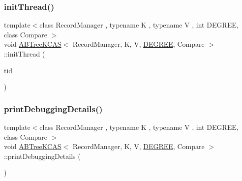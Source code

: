 \mbox{\label{classABTreeKCAS_a4cf7b4d16d93940cc660a636a86e2601}} 
\subsubsection{\texorpdfstring{init\+Thread()}{initThread()}}
{\footnotesize\ttfamily template$<$class Record\+Manager , typename K , typename V , int D\+E\+G\+R\+EE, class Compare $>$ \\
void \hyperlink{classABTreeKCAS}{A\+B\+Tree\+K\+C\+AS}$<$ Record\+Manager, K, V, \hyperlink{brown__sigouin__abtree__kcas_2adapter_8h_a5d88b17d70c985f2f2b8e987037fd6dd}{D\+E\+G\+R\+EE}, Compare $>$\+::init\+Thread (\begin{DoxyParamCaption}\item[{const int}]{tid }\end{DoxyParamCaption})}

\mbox{\label{classABTreeKCAS_affa4e717faf0e06819819c6c20c548c9}} 
\subsubsection{\texorpdfstring{print\+Debugging\+Details()}{printDebuggingDetails()}}
{\footnotesize\ttfamily template$<$class Record\+Manager , typename K , typename V , int D\+E\+G\+R\+EE, class Compare $>$ \\
void \hyperlink{classABTreeKCAS}{A\+B\+Tree\+K\+C\+AS}$<$ Record\+Manager, K, V, \hyperlink{brown__sigouin__abtree__kcas_2adapter_8h_a5d88b17d70c985f2f2b8e987037fd6dd}{D\+E\+G\+R\+EE}, Compare $>$\+::print\+Debugging\+Details (\begin{DoxyParamCaption}{ }\end{DoxyParamCaption})}

\mbox{\label{classABTreeKCAS_aec66944edfa684a080be76910cc5ca56}} 
